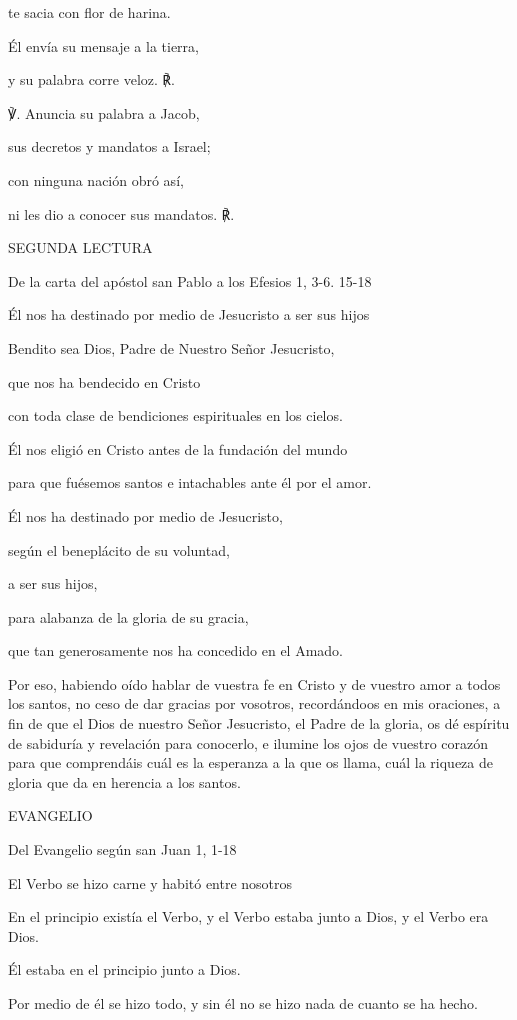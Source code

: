 \documentclass[]{article}
\begin{document}
te sacia con flor de harina.

Él envía su mensaje a la tierra,

y su palabra corre veloz. ℟.

℣. Anuncia su palabra a Jacob,

sus decretos y mandatos a Israel;

con ninguna nación obró así,

ni les dio a conocer sus mandatos. ℟.

SEGUNDA LECTURA

De la carta del apóstol san Pablo a los Efesios 1, 3-6. 15-18

Él nos ha destinado por medio de Jesucristo a ser sus hijos

Bendito sea Dios, Padre de Nuestro Señor Jesucristo,

que nos ha bendecido en Cristo

con toda clase de bendiciones espirituales en los cielos.

Él nos eligió en Cristo antes de la fundación del mundo

para que fuésemos santos e intachables ante él por el amor.

Él nos ha destinado por medio de Jesucristo,

según el beneplácito de su voluntad,

a ser sus hijos,

para alabanza de la gloria de su gracia,

que tan generosamente nos ha concedido en el Amado.

Por eso, habiendo oído hablar de vuestra fe en Cristo y de vuestro amor
a todos los santos, no ceso de dar gracias por vosotros, recordándoos en
mis oraciones, a fin de que el Dios de nuestro Señor Jesucristo, el
Padre de la gloria, os dé espíritu de sabiduría y revelación para
conocerlo, e ilumine los ojos de vuestro corazón para que comprendáis
cuál es la esperanza a la que os llama, cuál la riqueza de gloria que da
en herencia a los santos.

EVANGELIO

Del Evangelio según san Juan 1, 1-18

El Verbo se hizo carne y habitó entre nosotros

En el principio existía el Verbo, y el Verbo estaba junto a Dios, y el
Verbo era Dios.

Él estaba en el principio junto a Dios.

Por medio de él se hizo todo, y sin él no se hizo nada de cuanto se ha
hecho.
\end{document}
